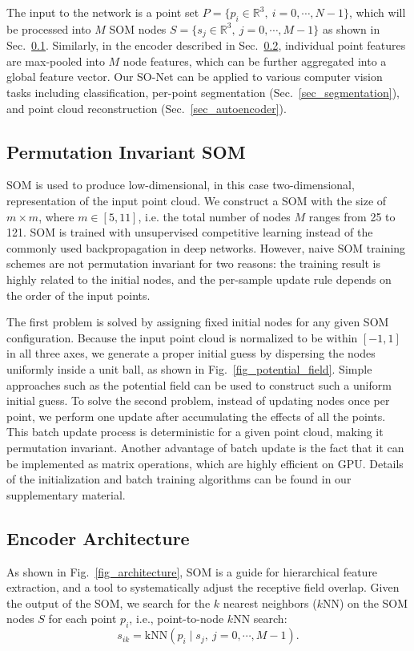 \documentclass[10pt,twocolumn,letterpaper]{article}
\begin{document}
The input to the network is a point set $P=\{p_i \in \mathbb{R}^3,~i = 0, \cdots, N-1\}$, which will be processed into $M$ SOM nodes $S=\{s_j \in \mathbb{R}^3,~j = 0, \cdots, M-1\}$ as shown in Sec.~\ref{sec_som}. Similarly, in the encoder described in Sec.~\ref{sec_encoder}, individual point features are max-pooled into $M$ node features, which can be further aggregated into a global feature vector. Our SO-Net can be applied to various computer vision tasks including classification, per-point segmentation (Sec.~\ref{sec_segmentation}), and point cloud reconstruction (Sec.~\ref{sec_autoencoder}).

\subsection{Permutation Invariant SOM} \label{sec_som}

SOM is used to produce low-dimensional, in this case two-dimensional, representation of the input point cloud. We construct a SOM with the size of $m \times m$, where $m \in [5,11]$, i.e. the total number of nodes $M$ ranges from 25 to 121. SOM is trained with unsupervised competitive learning instead of the commonly used backpropagation in deep networks. However, naive SOM training schemes are not permutation invariant for two reasons: the training result is highly related to the initial nodes, and the per-sample update rule depends on the order of the input points. 

The first problem is solved by assigning fixed initial nodes for any given SOM configuration. Because the input point cloud is normalized to be within $[-1,1]$ in all three axes, we generate a proper initial guess by dispersing the nodes uniformly inside a unit ball, as shown in Fig.~\ref{fig_potential_field}. Simple approaches such as the potential field can be used to construct such a uniform initial guess. To solve the second problem, instead of updating nodes once per point, we perform one update after accumulating the effects of all the points. This batch update process is deterministic \cite{kohonen1998self} for a given point cloud, making it permutation invariant. Another advantage of batch update is the fact that it can be implemented as matrix operations, which are highly efficient on GPU. Details of the initialization and batch training algorithms can be found in our supplementary material.

\subsection{Encoder Architecture} \label{sec_encoder}
As shown in Fig.~\ref{fig_architecture}, SOM is a guide for hierarchical feature extraction, and a tool to systematically adjust the receptive field overlap. Given the output of the SOM, we search for the $k$ nearest neighbors ($k$NN) on the SOM nodes $S$ for each point $p_i$, i.e., point-to-node $k$NN search:
\begin{equation}
s_{ik} = \text{kNN}(p_i \mid s_j,~j = 0, \cdots, M-1).
\end{equation}
\end{document}
